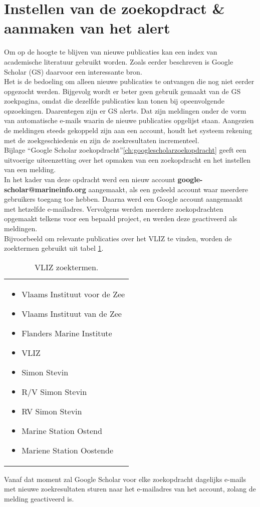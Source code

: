 \section{Instellen van de zoekopdract \& aanmaken van het alert}
Om op de hoogte te blijven van nieuwe publicaties kan een index van academische literatuur gebruikt worden. Zoals eerder beschreven is Google Scholar (GS) daarvoor een interessante bron.\\
Het is de bedoeling om alleen nieuwe publicaties te ontvangen die nog niet eerder opgezocht werden. Bijgevolg wordt er beter geen gebruik gemaakt van de GS zoekpagina, omdat die dezelfde publicaties kan tonen bij opeenvolgende opzoekingen. Daarentegen zijn er GS alerts. Dat zijn meldingen onder de vorm van automatische e-mails waarin de nieuwe publicaties opgelijst staan. Aangezien de meldingen steeds gekoppeld zijn aan een account, houdt het systeem rekening met de zoekgeschiedenis en zijn de zoekresultaten incrementeel.\\
Bijlage ``Google Scholar zoekopdracht''\ref{ch:googlescholarzoekopdracht} geeft een uitvoerige uiteenzetting over het opmaken van een zoekopdracht en het instellen van een melding.\\
In het kader van deze opdracht werd een nieuw account \textbf{google-scholar@marineinfo.org} aangemaakt, als een gedeeld account waar meerdere gebruikers toegang toe hebben. Daarna werd een Google account aangemaakt met hetzelfde e-mailadres. Vervolgens werden meerdere zoekopdrachten opgemaakt telkens voor een bepaald project, en werden deze geactiveerd als meldingen.\\
Bijvoorbeeld om relevante publicaties over het VLIZ te vinden, worden de zoektermen gebruikt uit tabel \ref{table:VLIZ zoektermen}.
\begin{table}[h!]
    \begin{tabularx}{\linewidth}{|X|}
        \hline
        \begin{itemize}
            \item Vlaams Instituut voor de Zee
            \item Vlaams Instituut van de Zee
            \item Flanders Marine Institute
            \item VLIZ
            \item Simon Stevin
            \item R/V Simon Stevin
            \item RV Simon Stevin
            \item Marine Station Ostend
            \item Mariene Station Oostende
        \end{itemize} \newline
        \hline
    \end{tabularx}
    \caption{VLIZ zoektermen.}
    \label{table:VLIZ zoektermen}
\end{table}


Vanaf dat moment zal Google Scholar voor elke zoekopdracht dagelijks e-mails met nieuwe zoekresultaten sturen naar het e-mailadres van het account, zolang de melding geactiveerd is.